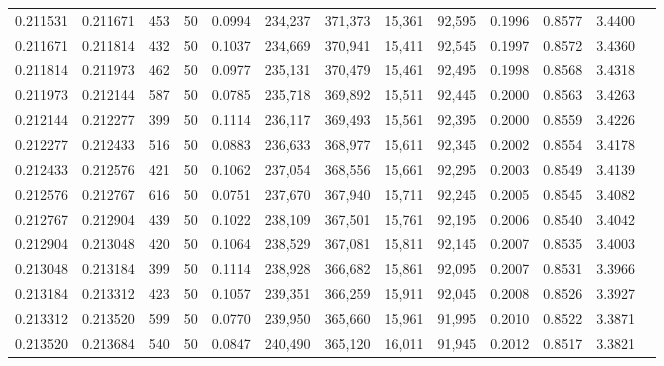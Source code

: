 \begin{tabular}{rrrrrrrrrrrrr}
0.211531 & 0.211671 &   453 &  50 &                                     0.0994 & 234,237 & 371,373 &  15,361 &  92,595 & 0.1996 & 0.8577 & 3.4400 \\
0.211671 & 0.211814 &   432 &  50 &                                     0.1037 & 234,669 & 370,941 &  15,411 &  92,545 & 0.1997 & 0.8572 & 3.4360 \\
0.211814 & 0.211973 &   462 &  50 &                                     0.0977 & 235,131 & 370,479 &  15,461 &  92,495 & 0.1998 & 0.8568 & 3.4318 \\
0.211973 & 0.212144 &   587 &  50 &                                     0.0785 & 235,718 & 369,892 &  15,511 &  92,445 & 0.2000 & 0.8563 & 3.4263 \\
0.212144 & 0.212277 &   399 &  50 &                                     0.1114 & 236,117 & 369,493 &  15,561 &  92,395 & 0.2000 & 0.8559 & 3.4226 \\
0.212277 & 0.212433 &   516 &  50 &                                     0.0883 & 236,633 & 368,977 &  15,611 &  92,345 & 0.2002 & 0.8554 & 3.4178 \\
0.212433 & 0.212576 &   421 &  50 &                                     0.1062 & 237,054 & 368,556 &  15,661 &  92,295 & 0.2003 & 0.8549 & 3.4139 \\
0.212576 & 0.212767 &   616 &  50 &                                     0.0751 & 237,670 & 367,940 &  15,711 &  92,245 & 0.2005 & 0.8545 & 3.4082 \\
0.212767 & 0.212904 &   439 &  50 &                                     0.1022 & 238,109 & 367,501 &  15,761 &  92,195 & 0.2006 & 0.8540 & 3.4042 \\
0.212904 & 0.213048 &   420 &  50 &                                     0.1064 & 238,529 & 367,081 &  15,811 &  92,145 & 0.2007 & 0.8535 & 3.4003 \\
0.213048 & 0.213184 &   399 &  50 &                                     0.1114 & 238,928 & 366,682 &  15,861 &  92,095 & 0.2007 & 0.8531 & 3.3966 \\
0.213184 & 0.213312 &   423 &  50 &                                     0.1057 & 239,351 & 366,259 &  15,911 &  92,045 & 0.2008 & 0.8526 & 3.3927 \\
0.213312 & 0.213520 &   599 &  50 &                                     0.0770 & 239,950 & 365,660 &  15,961 &  91,995 & 0.2010 & 0.8522 & 3.3871 \\
0.213520 & 0.213684 &   540 &  50 &                                     0.0847 & 240,490 & 365,120 &  16,011 &  91,945 & 0.2012 & 0.8517 & 3.3821 \\

\end{tabular}
